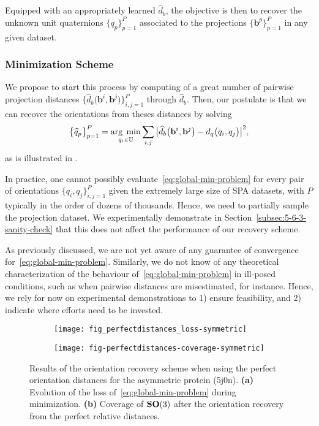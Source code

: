 Equipped with an appropriately learned $\widehat{d}_b$, the objective is then to recover the unknown unit quaternions $\big\{q_p\big\}_{p=1}^P$ associated to the projections $\big\{\mathbf{b}^p\big\}_{p=1}^P$ in any given dataset.

\subsubsection{Minimization Scheme}

We propose to start this process by computing of a great number of pairwise projection distances $\big\{\widehat{d}_b\big(\mathbf{b}^i,\mathbf{b}^j\big)\big\}_{i,j=1}^{P}$ through $\widehat{d}_b$. Then, our postulate is that we can recover the orientations from theses distances by solving
\begin{equation}
    \label{eq:global-min-problem}
    \big\{\widehat{q}_p\big\}_{p=1}^P=\underset{q_i\in\mathbb{U}}{\arg\;\min}\sum_{i,j} \big|\widehat{d}_b\big(\mathbf{b}^i,\mathbf{b}^j\big) - d_q\big(q_i,q_j\big) \big|^2,
\end{equation}
as is illustrated in .

In practice, one cannot possibly evaluate~\eqref{eq:global-min-problem} for every pair of orientations $\big\{q_i,q_j\big\}_{i,j=1}^P$ given the extremely large size of SPA datasets, with $P$ typically in the order of dozens of thousands. Hence, we need to partially sample the projection dataset. We experimentally demonstrate in Section~\ref{subsec:5-6-3-sanity-check} that this does not affect the performance of our recovery scheme.

As previously discussed, we are not yet aware of any guarantee of convergence for~\eqref{eq:global-min-problem}. Similarly, we do not know of any theoretical characterization of the behaviour of~\eqref{eq:global-min-problem} in ill-posed conditions, such as when pairwise distances are misestimated, for instance. Hence, we rely for now on experimental demonstrations to 1) ensure feasibility, and 2) indicate where efforts need to be invested.

\begin{figure}
    \centering
    \begin{subfigure}[b]{0.48\textwidth}
        \texttt{[image: fig\_perfectdistances\_loss-symmetric]}
        \caption{}
    \end{subfigure} \quad
    \begin{subfigure}[b]{0.48\textwidth}
    \centering
        \texttt{[image: fig-perfectdistances-coverage-symmetric]}
        \caption{}
    \end{subfigure}
    \caption{Results of the orientation recovery scheme when using the perfect orientation distances for the asymmetric protein (5j0n). \textbf{(a)} Evolution of the loss of~\eqref{eq:global-min-problem} during minimization. \textbf{(b)} Coverage of $\mathrm{\mathbf{SO}}(3)$ after the orientation recovery from the perfect relative distances. }
    \label{fig:minim-loss-perfect-distances}
\end{figure}
